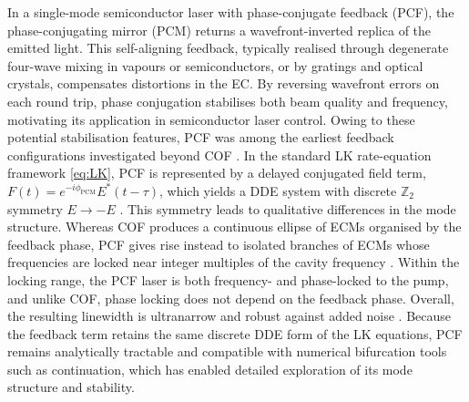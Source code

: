 In a single-mode semiconductor laser with phase-conjugate feedback (PCF), the phase-conjugating mirror (PCM) returns a wavefront-inverted replica of the emitted light.
This self-aligning feedback, typically realised through degenerate four-wave mixing in vapours or semiconductors, or by gratings and optical crystals, compensates distortions in the EC.
By reversing wavefront errors on each round trip, phase conjugation stabilises both beam quality and frequency, motivating its application in semiconductor laser control.
Owing to these potential stabilisation features, PCF was among the earliest feedback configurations investigated beyond COF \cite{krauskopf1998semiconductor, green2004bifurcation}.
In the standard LK rate-equation framework \eqref{eq:LK}, PCF is represented by a delayed conjugated field term, $F(t) = e^{-i \phi_\text{PCM}} E^*(t-\tau)$, which yields a DDE system with discrete $\mathbb{Z}_2$ symmetry $E \rightarrow -E$ \cite{krauskopf2002routes}.
This symmetry leads to qualitative differences in the mode structure.
Whereas COF produces a continuous ellipse of ECMs organised by the feedback phase, PCF gives rise instead to isolated branches of ECMs whose frequencies are locked near integer multiples of the cavity frequency \cite{erneux2003external}.
Within the locking range, the PCF laser is both frequency- and phase-locked to the pump, and unlike COF, phase locking does not depend on the feedback phase.
Overall, the resulting linewidth is ultranarrow and robust against added noise \cite{green2002global}.
Because the feedback term retains the same discrete DDE form of the LK equations, PCF remains analytically tractable and compatible with numerical bifurcation tools such as continuation, which has enabled detailed exploration of its mode structure and stability.
%
